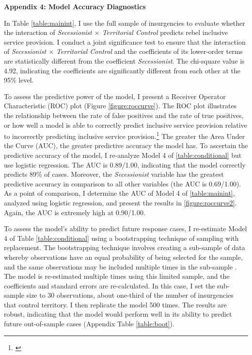 \documentclass[12pt, letterpaper]{article}
\begin{document}
\newpage
\clearpage
\begin{center}
\Large{\textbf{Appendix 4: Model Accuracy Diagnostics}}
\end{center}

In Table \ref{table:mainint}, I use the full sample of insurgencies to evaluate whether the interaction of \textit{Secessionist $\times$ Territorial Control} predicts rebel inclusive service provision. I conduct a joint significance test to ensure that the interaction of \textit{Secessionist $\times$ Territorial Control} and the coefficients of its lower-order terms are statistically different from the coefficient \textit{Secessionist}. The chi-square value is 4.92, indicating the coefficients are significantly different from each other at the 95\% level.

To assess the predictive power of the model, I present a Receiver Operator Characteristic (ROC) plot (Figure \ref{figure:roccurve}). The ROC plot illustrates the relationship between the rate of false positives and the rate of true positives, or how well a model is able to correctly predict inclusive service provision relative to incorrectly predicting inclusive service provision.\footnote{\citealt{ward2010perils, young2012repression}} The greater the Area Under the Curve (AUC), the greater predictive accuracy the model has. To ascertain the predictive accuracy of the model, I re-analyze Model 4 of \autoref{table:conditional} but use logistic regression. The AUC is 0.89/1.00, indicating that the model correctly predicts 89\% of cases. Moreover, the \textit{Secessionist} variable has the greatest predictive accuracy in comparison to all other variables (the AUC is 0.69/1.00). As a point of comparison, I determine the AUC of Model 4 of \autoref{table:mainint}, analyzed using logistic regression, and present the results in \autoref{figure:roccurve2}. Again, the AUC is extremely high at 0.90/1.00.




To assess the model's ability to predict future response cases, I re-estimate Model 4 of Table \ref{table:conditional} using a bootstrapping technique of sampling with replacement. The bootstrapping technique involves creating a sub-sample of data whereby observations have an equal probability of being selected for the sample, and the same observations may be included multiple times in the sub-sample \citep{efron1983leisurely, efron1997improvements}. The model is re-estimated multiple times using this limited sample, and the coefficients and standard errors are re-calculated. In this case, I set the sub-sample size to 30 observations, about one-third of the number of insurgencies that control territory. I then replicate the model 500 times. The results are robust, indicating that the model would perform well in its ability to predict future out-of-sample cases (Appendix Table \ref{table:boot}).
\end{document}
